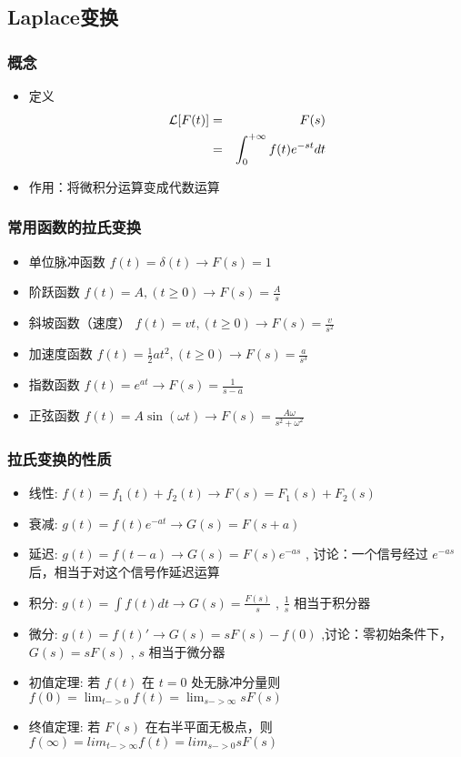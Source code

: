 \documentclass{article}
\begin{document}
\subsection{Laplace变换}
\label{sec-2-1}
\begin{frame}
\frametitle{概念}
\label{sec-2-1-1}

\begin{itemize}
\item <2->定义
       \begin{eqnarray*}
       {\cal L}[F(t)] &=& F(s) \\
       	&=& \int_0^{+\infty}f(t)e^{-st}dt
       \end{eqnarray*}
\item <3->作用：将微积分运算变成代数运算
\end{itemize}
\end{frame}
\begin{frame}
\frametitle{常用函数的拉氏变换}
\label{sec-2-1-2}

\begin{itemize}
\item <2->单位脉冲函数 $f(t)=\delta(t) \rightarrow   F(s)=1$
\item <3->阶跃函数 $f(t)=A,(t\geq 0) \rightarrow   F(s)=\frac{A}{s}$
\item <4->斜坡函数（速度）  $f(t)=vt,(t\geq0) \rightarrow F(s)=\frac{v}{s^2}$
\item <5->加速度函数  $f(t)=\frac{1}{2}at^2,(t\geq 0) \rightarrow  F(s)=\frac{a}{s^3}$
\item <6->指数函数 $f(t)=e^{at} \rightarrow  F(s)=\frac{1}{s-a}$
\item <7->正弦函数 $f(t)=A\sin(\omega t)\rightarrow F(s)=\frac{A\omega}{s^2+\omega^2}$
\end{itemize}
\end{frame}
\begin{frame}
\frametitle{拉氏变换的性质}
\label{sec-2-1-3}

\begin{itemize}
\item <2->线性: $f(t)=f_1(t)+f_2(t)\rightarrow  F(s)=F_1(s)+F_2(s)$
\item <3->衰减: $g(t)=f(t)e^{-at} \rightarrow G(s)=F(s+a)$
\item <4->延迟: $g(t)=f(t-a) \rightarrow  G(s)=F(s)e^{-as}$ , 讨论：一个信号经过 $e^{-as}$ 后，相当于对这个信号作延迟运算
\item <5->积分: $g(t)=\int f(t) dt \rightarrow  G(s)=\frac{F(s)}{s}$ , $\frac{1}{s}$ 相当于积分器
\item <6->微分: $g(t)=f(t)'\rightarrow  G(s)=sF(s)-f(0)$ ,讨论：零初始条件下， $G(s)=sF(s)$ , $s$ 相当于微分器
\item <7->初值定理: 若 $f(t)$ 在 $t=0$ 处无脉冲分量则 $f(0)=\lim_{t->0}f(t)=\lim_{s->\infty}sF(s)$
\item <8->终值定理: 若 $F(s)$ 在右半平面无极点，则 $f(\infty)=lim_{t->\infty}f(t)=lim_{s->0}sF(s)$
\end{itemize}
\end{frame}
\end{document}
